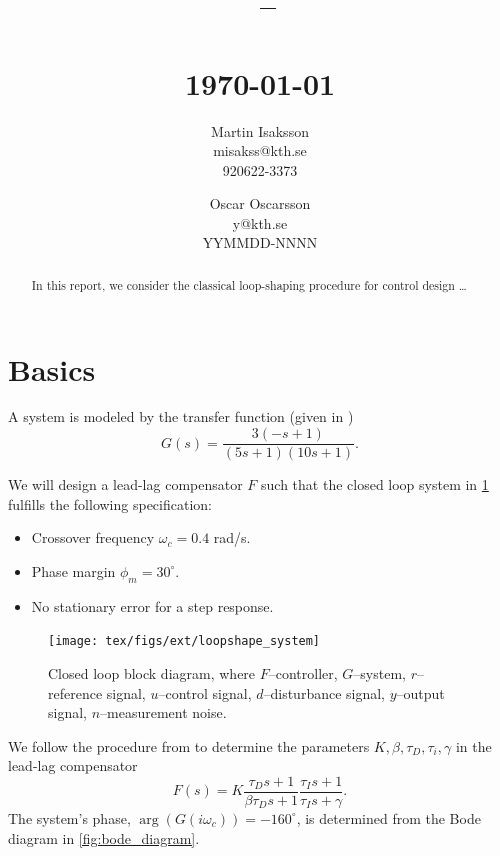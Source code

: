 \documentclass[a4paper]{article}
\title{
	\vspace{1.5in}
	\textmd{\textbf{\hmwkClass\ -- \hmwkClassName}}\\
	\vspace{0.2in}
	\textmd{\textbf{\hmwkTitle}}\\
	\normalsize\vspace{0.1in}\small{\today}\\
	\vspace{2in}
}
\author{
	Martin Isaksson\\
	misakss@kth.se\\
	920622-3373
	\and
	Oscar Oscarsson\\
	y@kth.se\\
	YYMMDD-NNNN
}
\date{}
\begin{document}
\maketitle

\vfill
\begin{abstract}
	In this report, we consider the classical loop-shaping procedure for control design \ldots
\end{abstract}

\newpage



\section{Basics}
A system is modeled by the transfer function (given in \cite{exercise})
\begin{equation}
	G(s) = \frac{3(-s+1)}{(5s+1)(10s+1)}.
	\label{eq:system}
\end{equation}

We will design a lead-lag compensator $F$ such that the closed loop system in \cref{fig:block_diagram} fulfills the following specification:
\begin{itemize}\setlength{\itemsep}{-2pt}
	\item Crossover frequency $\omega_c = 0.4$ rad/s.
	\item Phase margin $\phi_m = 30^\circ$.
	\item No stationary error for a step response.
\end{itemize}

\begin{figure}[h!]
	\begin{center}
		\texttt{[image: tex/figs/ext/loopshape\_system]}
	\end{center}
	\caption{Closed loop block diagram, where $F$--controller, $G$--system, $r$--reference signal, $u$--control signal, $d$--disturbance signal, $y$--output signal, $n$--measurement noise.}
	\label{fig:block_diagram}
\end{figure}

We follow the procedure from \cite{basic_book} to determine the parameters $K, \beta, \tau_D, \tau_i, \gamma$ in the lead-lag compensator
\begin{equation}
	F(s) = K \frac{\tau_D s + 1}{\beta \tau_D s + 1} \frac{\tau_I s + 1}{\tau_I s + \gamma}.
	\label{eq:lead_lag}
\end{equation}
The system's phase, $\arg(G(i\omega_c)) = -160^\circ$, is determined from the Bode diagram in \cref{fig:bode_diagram}.
\end{document}
